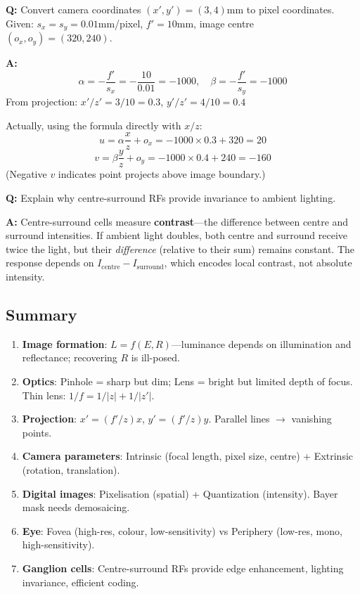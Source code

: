 \begin{exbox}
\textbf{Q:} Convert camera coordinates $(x', y') = (3, 4)$mm to pixel coordinates. Given: $s_x = s_y = 0.01$mm/pixel, $f' = 10$mm, image centre $(o_x, o_y) = (320, 240)$.

\textbf{A:}
\[
\alpha = -\frac{f'}{s_x} = -\frac{10}{0.01} = -1000, \quad \beta = -\frac{f'}{s_y} = -1000
\]
From projection: $x'/z' = 3/10 = 0.3$, $y'/z' = 4/10 = 0.4$

Actually, using the formula directly with $x/z$:
\[
u = \alpha \frac{x}{z} + o_x = -1000 \times 0.3 + 320 = 20
\]
\[
v = \beta \frac{y}{z} + o_y = -1000 \times 0.4 + 240 = -160
\]
(Negative $v$ indicates point projects above image boundary.)
\end{exbox}

\begin{exbox}
\textbf{Q:} Explain why centre-surround RFs provide invariance to ambient lighting.

\textbf{A:} Centre-surround cells measure \textbf{contrast}---the difference between centre and surround intensities. If ambient light doubles, both centre and surround receive twice the light, but their \textit{difference} (relative to their sum) remains constant. The response depends on $I_{\text{centre}} - I_{\text{surround}}$, which encodes local contrast, not absolute intensity.
\end{exbox}

\bigseparator

\subsection{Summary}

\begin{keybox}
\begin{enumerate}
  \item \textbf{Image formation}: $L = f(E, R)$---luminance depends on illumination and reflectance; recovering $R$ is ill-posed.
  \item \textbf{Optics}: Pinhole = sharp but dim; Lens = bright but limited depth of focus. Thin lens: $1/f = 1/|z| + 1/|z'|$.
  \item \textbf{Projection}: $x' = (f'/z)x$, $y' = (f'/z)y$. Parallel lines $\rightarrow$ vanishing points.
  \item \textbf{Camera parameters}: Intrinsic (focal length, pixel size, centre) + Extrinsic (rotation, translation).
  \item \textbf{Digital images}: Pixelisation (spatial) + Quantization (intensity). Bayer mask needs demosaicing.
  \item \textbf{Eye}: Fovea (high-res, colour, low-sensitivity) vs Periphery (low-res, mono, high-sensitivity).
  \item \textbf{Ganglion cells}: Centre-surround RFs provide edge enhancement, lighting invariance, efficient coding.
\end{enumerate}
\end{keybox}

